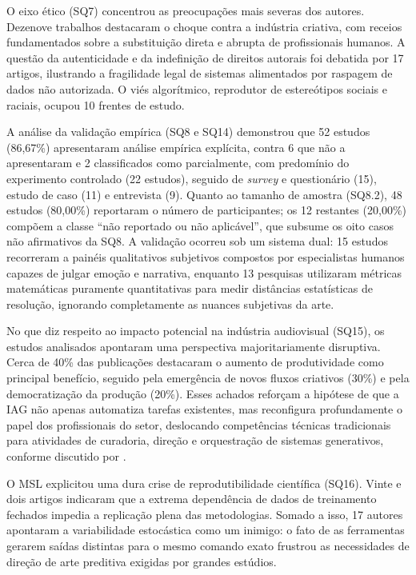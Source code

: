 O eixo ético (SQ7) concentrou as preocupações mais severas dos autores. Dezenove trabalhos destacaram o choque contra a indústria criativa, com receios fundamentados sobre a substituição direta e abrupta de profissionais humanos. A questão da autenticidade e da indefinição de direitos autorais foi debatida por 17 artigos, ilustrando a fragilidade legal de sistemas alimentados por raspagem de dados não autorizada. O viés algorítmico, reprodutor de estereótipos sociais e raciais, ocupou 10 frentes de estudo.

A análise da validação empírica (SQ8 e SQ14) demonstrou que 52 estudos (86,67\%) apresentaram análise empírica explícita, contra 6 que não a apresentaram e 2 classificados como parcialmente, com predomínio do experimento controlado (22 estudos), seguido de \textit{survey} e questionário (15), estudo de caso (11) e entrevista (9). Quanto ao tamanho de amostra (SQ8.2), 48 estudos (80,00\%) reportaram o número de participantes; os 12 restantes (20,00\%) compõem a classe ``não reportado ou não aplicável'', que subsume os oito casos não afirmativos da SQ8. A validação ocorreu sob um sistema dual: 15 estudos recorreram a painéis qualitativos subjetivos compostos por especialistas humanos capazes de julgar emoção e narrativa, enquanto 13 pesquisas utilizaram métricas matemáticas puramente quantitativas para medir distâncias estatísticas de resolução, ignorando completamente as nuances subjetivas da arte.

No que diz respeito ao impacto potencial na indústria audiovisual (SQ15), os estudos analisados apontaram uma perspectiva majoritariamente disruptiva. Cerca de 40\% das publicações destacaram o aumento de produtividade como principal benefício, seguido pela emergência de novos fluxos criativos (30\%) e pela democratização da produção (20\%). Esses achados reforçam a hipótese de que a IAG não apenas automatiza tarefas existentes, mas reconfigura profundamente o papel dos profissionais do setor, deslocando competências técnicas tradicionais para atividades de curadoria, direção e orquestração de sistemas generativos, conforme discutido por \citet{RothAleo2026}.

O MSL explicitou uma dura crise de reprodutibilidade científica (SQ16). Vinte e dois artigos indicaram que a extrema dependência de dados de treinamento fechados impedia a replicação plena das metodologias. Somado a isso, 17 autores apontaram a variabilidade estocástica como um inimigo: o fato de as ferramentas gerarem saídas distintas para o mesmo comando exato frustrou as necessidades de direção de arte preditiva exigidas por grandes estúdios.


